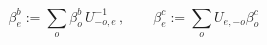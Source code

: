 \begin{equation}
\beta _{e}^{b}:=\sum_{o}\beta _{o}^{b}\,U_{-o,e}^{-1}\,,\qquad \beta
_{e}^{c}:=\sum_{o}U_{e,-o}\beta _{o}^{c}\,  \label{evenmode_fields}
\end{equation}

